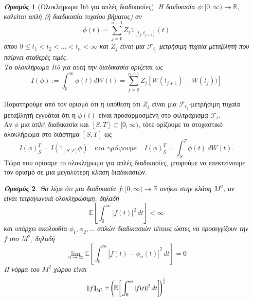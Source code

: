 \documentclass[12pt,a4paper,twoside,openany]{book}
\newtheorem{definition}{\textit{Ορισμός}}[section]
\begin{document}
	\begin{definition}[Ολοκλήρωμα Itô για απλές διαδικασίες]
		Η διαδικασία $\phi:[0,\infty)\rightarrow\mathbb{R}$, καλείται απλή (ή διαδικασία τυχαίου βήματος) αν 
		\[\phi(t)= \sum_{j=0}^{n-1}Z_{j}\mathds{1}_{[t_j,t_{j+1}]} (t) \]
		όπου $0\leq t_1<t_2<\dots<t_n<\infty$ και $Z_j$ είναι μια $\mathcal{F}_{t_j}$-μετρήσιμη τυχαία μεταβλητή που παίρνει σταθερές τιμές.\\
		Το ολοκλήρωμα Itô για αυτή την διαδικασία ορίζεται ως
		\[I(\phi) := \int_{0}^{\infty}\phi(t)dW(t) = \sum_{j=0}^{n-1}Z_{j}[W(t_{j+1}) - W(t_j))]        \label{Itoforelementary}\tag{2.2.1}\]
	\end{definition}
	\vspace{2.5mm}
	\noindent Παρατηρούμε από τον ορισμό ότι η υπόθεση ότι $Z_j$ είναι μια $\mathcal{F}_{t_j}$-μετρήσιμη τυχαία μεταβλητή εγγυάται ότι η $\phi(t)$ είναι προσαρμοσμένη στο φιλτράρισμα $\mathcal{F}_{t}$.\\
	Αν $\phi$ μια απλή διαδικασία και $[S,T]\subset[0,\infty)$, τότε ορίζουμε το στοχαστικό ολοκλήρωμα στο διάστημα $[S,T]$ ως \[I(\phi)_{S}^{T}= I(\mathds{1}_{[S,T]} \phi) \quad \text{και γράφουμε} \quad I(\phi)_{S}^{T}=\int_{S}^{T}\phi(t)\, dW(t).\]
	\noindent Τώρα που ορίσαμε το ολοκλήρωμα για απλές διαδικασίες, μπορούμε να επεκτείνουμε τον ορισμό σε μια μεγαλύτερη κλάση διαδικασιών.
	\begin{definition}
		Θα λέμε ότι μια διαδικασία $f:[0,\infty)\rightarrow\mathbb{R}$ ανήκει στην κλάση $M^2$, αν είναι τετραγωνικά ολοκληρώσιμη, δηλαδή
		\[\mathbb{E}\left[\int_{0}^{\infty}|f(t)|^2\, dt \right] < \infty\]
		και υπάρχει ακολουθία $\phi_1,\phi_2,\dots$ απλών διαδικασιών τέτοιες ώστες να προσεγγίζουν την $f$ στο $ M^2$, δηλαδή
		\[\lim_{n\rightarrow\infty} \mathbb{E}\left[\int_{0}^{\infty}|f(t)-\phi_n(t)|^2\, dt \right]=0 \label{Convergence}\tag{2.2.2}\]
		Η νόρμα του $M^2$ χώρου είναι \[\norm{f}_{M^2}= \left(\mathbb{E}\left[\int_{0}^{\infty}|f(t)|^2 \, dt\right]\right)^{\frac{1}{2}} \]
	\end{definition}
	
\end{document}
